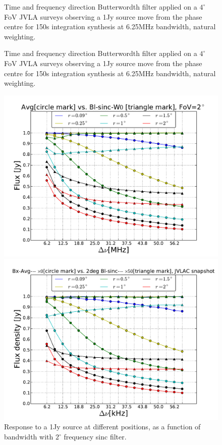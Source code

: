 \documentclass[useAMS,usenatbib]{mn2e}
\begin{document}
\begin{figure}
\begin{minipage}{0.36\linewidth}
   \caption{Time and frequency 
   direction Butterwordth filter applied on a $4^{\circ}$ FoV JVLA surveys observing a 1Jy source move from the phase centre for 150s 
  integration synthesis at 6.25MHz bandwidth, natural weighting.}
  \label{fig:Bl-butter-FoV4}\end{minipage}
  \caption{Time and frequency 
  direction Butterwordth filter applied on a $4^{\circ}$ FoV JVLA surveys observing a 1Jy source move from the phase centre for 150s 
  integration synthesis at 6.25MHz bandwidth, natural weighting.}
  \end{figure} 
  \begin{figure}
    \centering
  \begin{minipage}{0.36\linewidth}\includegraphics[width=1\textwidth]{./Figures/max-integ-freq-sinc-w1x1-fov2.pdf}
    \caption{Response to a 1Jy source at different positions, as a function of  bandwidth with $2^{\circ}$ frequency sinc filter.}
    \label{fig:max-integ-freq-sinc-w1x1-fov2}
  \end{minipage}
  \hspace{1cm}
  \begin{minipage}{0.36\linewidth}\includegraphics[width=1\textwidth]{./Figures/max-integ-freq-sinc-w1x50-fov2.pdf}

\end{minipage}
\end{figure}
\end{document}
